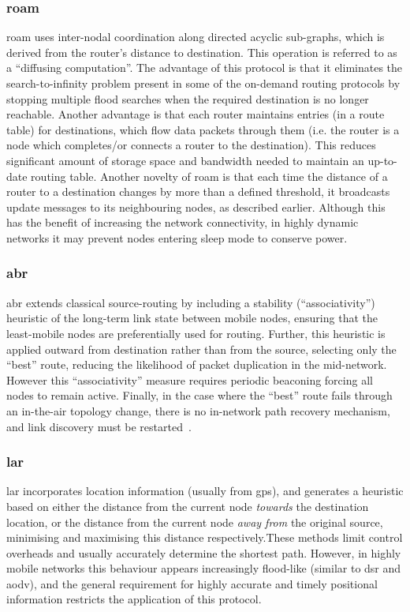 {\subsubsection{\gls{roam}}
\gls{roam} uses inter-nodal coordination along directed acyclic sub-graphs, which is derived from the router’s distance to destination. This operation is referred to as a “diffusing computation”. The advantage of this protocol is that it eliminates the search-to-infinity problem present in some of the on-demand routing protocols by stopping multiple flood searches when the required destination is no longer reachable. Another advantage is that each router maintains entries (in a route table) for destinations, which flow data packets through them (i.e. the router is a node which completes/or connects a router to the destination). This reduces significant amount of storage space and bandwidth needed to maintain an up-to-date routing table. Another novelty of \gls{roam} is that each time the distance of a router to a destination changes by more than a defined threshold, it broadcasts update messages to its neighbouring nodes, as described earlier. Although this has the benefit of increasing the network connectivity, in highly dynamic networks it may prevent nodes entering sleep mode to conserve power. %

\subsubsection{\gls{abr}}
\gls{abr} extends classical source-routing by including a stability (``associativity'') heuristic of the long-term link state between mobile nodes, ensuring that the least-mobile nodes are preferentially used for routing. Further, this heuristic is applied outward from destination rather than from the source, selecting only the ``best'' route, reducing the likelihood of packet duplication in the mid-network. However this ``associativity'' measure requires periodic beaconing forcing all nodes to remain active. Finally, in the case where the ``best'' route fails through an in-the-air topology change, there is no in-network path recovery mechanism, and link discovery must be restarted~\cite{Toh1997}.

\subsubsection{\gls{lar}}
\gls{lar} incorporates location information (usually from \gls{gps}), and generates a heuristic based on either the distance from the current node \emph{towards} the destination location, or the distance from the current node \emph{away from} the original source, minimising and maximising this distance respectively.These methods limit control overheads and usually accurately determine the shortest path. However, in highly mobile networks this behaviour appears increasingly flood-like (similar to \gls{dsr} and \gls{aodv}), and the general requirement for highly accurate and timely positional information restricts the application of this protocol.

}
